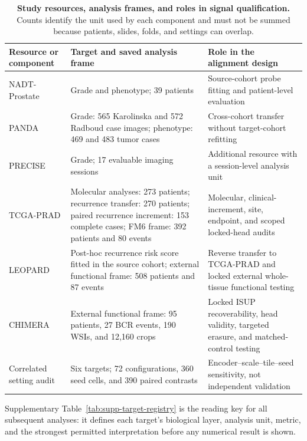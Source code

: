 \begin{table}[H]
\centering
\footnotesize
\setlength{\tabcolsep}{4pt}
\renewcommand{\arraystretch}{1.10}
\caption{\textbf{Study resources, analysis frames, and roles in signal qualification.}
Counts identify the unit used by each component and must not be summed because patients,
slides, folds, and settings can overlap.}
\label{tab:supp-resource-orientation}
\begin{tabular}{@{}>{\raggedright\arraybackslash}p{}
>{\raggedright\arraybackslash}p{}
>{\raggedright\arraybackslash}p{}@{}}
\toprule
Resource or component & Target and saved analysis frame & Role in the alignment design \\
\midrule
NADT-Prostate & Grade and phenotype; 39 patients & Source-cohort probe fitting and
patient-level evaluation \\
PANDA & Grade: 565 Karolinska and 572 Radboud case images; phenotype: 469 and 483 tumor cases
& Cross-cohort transfer without target-cohort refitting \\
PRECISE & Grade; 17 evaluable imaging sessions & Additional resource with a session-level
analysis unit \\
TCGA-PRAD & Molecular analyses: 273 patients; recurrence transfer: 270 patients; paired
recurrence increment: 153 complete cases; FM6 frame: 392 patients and 80 events & Molecular,
clinical-increment, site, endpoint, and scoped locked-head audits \\
LEOPARD & Post-hoc recurrence risk score fitted in the source cohort; external functional
frame: 508 patients and 87 events & Reverse transfer to TCGA-PRAD and locked external
whole-tissue functional testing \\
CHIMERA & External functional frame: 95 patients, 27 BCR events, 190 WSIs, and 12,160 crops &
Locked ISUP recoverability, head validity, targeted erasure, and matched-control testing \\
Correlated setting audit & Six targets; 72 configurations, 360 seed cells, and 390 paired
contrasts & Encoder--scale--tile--seed sensitivity, not independent validation \\
\bottomrule
\end{tabular}
\end{table}

Supplementary Table~\ref{tab:supp-target-registry} is the reading key for all subsequent analyses: it
defines each target's biological layer, analysis unit, metric, and the strongest permitted
interpretation before any numerical result is shown.

